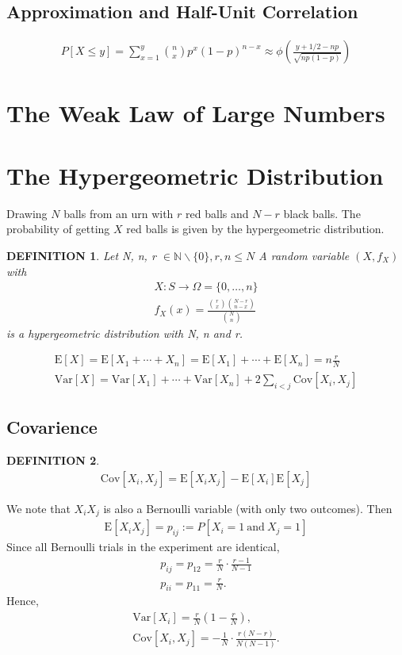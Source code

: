 \documentclass[11pt,a4paper]{article}
\newtheorem*{definition}{\bf DEFINITION}
\begin{document}
\subsection{Approximation and Half-Unit Correlation}
\begin{gather*}
    P[X\le y] = \sum_{x=1}^{y}\binom{n}{x}p^x(1-p)^{n-x}\approx\phi\left(\frac{y+1/2-np}{\sqrt{np(1-p)}}\right)
\end{gather*}

\section{The Weak Law of Large Numbers}

\section{The Hypergeometric Distribution}
Drawing $N$ balls from an urn with $r$ red balls and $N-r$ black balls.
The probability of getting $X$ red balls is given by the hypergeometric distribution.
\begin{definition}
    Let N, n, r $\in\mathbb{N}\backslash\{0\}, r, n\le N$
    A random variable $(X, f_X)$ with
    \begin{gather*}
        X:S\rightarrow\Omega=\{0,\dots, n\}\\
        f_X(x)=\frac{\binom{r}{x}\binom{N-r}{n-x}}{\binom{N}{n}}
    \end{gather*}
    is a hypergeometric distribution with N, n and r.
\end{definition}
\begin{gather*}
    \mathrm{E}[X]=\mathrm{E}[X_1+\cdots+X_n]=\mathrm{E}[X_1]+\cdots+\mathrm{E}[X_n]=n\frac{r}{N}\\
    \mathrm{Var}[X]=\mathrm{Var}[X_1]+\cdots+\mathrm{Var}[X_n]+2\sum_{i<j}^{}\mathrm{Cov}[X_i,X_j]
\end{gather*}
\subsection{Covarience}
\begin{definition}
    \begin{gather*}
        \mathrm{Cov}[X_i,X_j]=\mathrm{E}[X_iX_j]-\mathrm{E}[X_i]\mathrm{E}[X_j]
    \end{gather*}
\end{definition}
We note that $X_iX_j$ is also a Bernoulli variable (with only two outcomes).
Then
\begin{gather*}
    \mathrm{E}[X_iX_j]=p_{ij}:=P[X_i=1\ \mathrm{and}\ X_j=1]
\end{gather*}
Since all Bernoulli trials in the experiment are identical,
\begin{gather*}
    p_{ij} = p_{12}=\frac{r}{N}\cdot\frac{r-1}{N-1}\\
    p_{ii} = p_{11}=\frac{r}{N}.
\end{gather*}
Hence,
\begin{gather*}
    \mathrm{Var}[X_i]=\frac{r}{N}\left(1-\frac{r}{N}\right),\\
    \mathrm{Cov}[X_i,X_j]=-\frac{1}{N}\cdot\frac{r(N-r)}{N(N-1)}.
\end{gather*}
\end{document}

